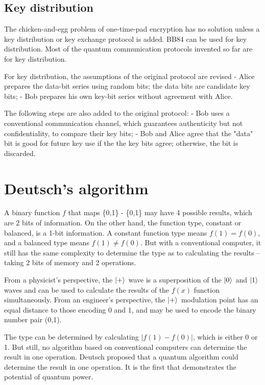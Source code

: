 \documentclass[oneside, letter, 12pt]{book}
\begin{document}
\subsection{Key distribution}
The chicken-and-egg problem of one-time-pad encryption has no solution unless a key distribution or key exchange protocol is added. BB84 can be used for key distribution. Most of the quantum communication protocols invented so far are for key distribution.

For key distribution, the assumptions of the original protocol are revised
- Alice prepares the data-bit series using random bits; the data bits are candidate key bits;
- Bob prepares his own key-bit series without agreement with Alice.

The following steps are also added to the original protocol:
- Bob uses a conventional communication channel, which guarantees authenticity but not confidentiality, to compare their key bits;
- Bob and Alice agree that the "data" bit is good for future key use if the the key bits agree; otherwise, the bit is discarded.

\section{Deutsch's algorithm}\label{S-Deutsch}
A binary function $f$ that maps \{0,1\} -\> \{0,1\} may have 4 possible results, which are 2 bits of information. On the other hand, the function type, constant or balanced, is a 1-bit information. A constant function type means $f(1)=f(0)$, and a balanced type means $f(1)\neq f(0)$. But with a conventional computer, it still has the same complexity to determine the type as to calculating the results -- taking 2 bits of memory and 2 operations.

From a physicist's perspective, the $\vert {+} \rangle_{}$ wave is a superposition of the $\vert {0} \rangle_{}$ and $\vert {1} \rangle_{}$ waves and can be used to calculate the results of the $f(x)$ function simultaneously. From an engineer's perspective, the $\vert {+} \rangle_{}$ modulation point has an equal distance to those encoding 0 and 1, and may be used to encode the binary number pair (0,1).

The type can be determined by calculating $|f(1)-f(0)|$, which is either 0 or 1. But still, no algorithm based on conventional computers can determine the result in one operation. Deutsch proposed that a quantum algorithm\cite{1985Deutsch} could determine the result in one operation. It is the first that demonstrates the potential of quantum power.
\end{document}
